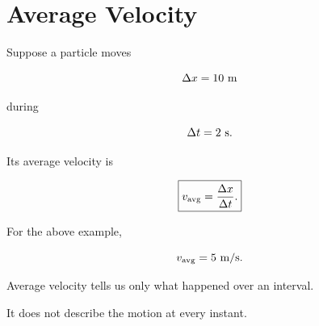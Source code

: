 \section{Average Velocity}

Suppose a particle moves

\[
\Delta x
=
10\ {\rm m}
\]

during

\[
\Delta t
=
2\ {\rm s}.
\]

Its average velocity is

\[
\boxed{
	v_{\rm avg}
	=
	\frac{\Delta x}{\Delta t}.
}
\]

For the above example,

\[
v_{\rm avg}
=
5\ {\rm m/s}.
\]

Average velocity tells us only what happened over an interval.

It does not describe the motion at every instant.

